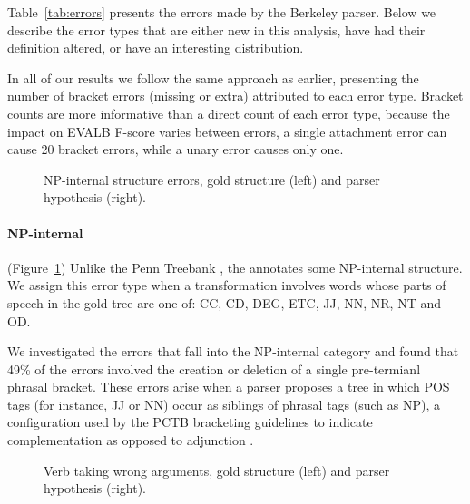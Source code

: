 Table~\ref{tab:errors} presents the errors made by the Berkeley parser.
Below we describe the error types that are either new in this analysis, have had their definition altered, or have an interesting distribution.

In all of our results we follow the same approach as earlier, presenting the number of bracket errors (missing or extra) attributed to each error type.
Bracket counts are more informative than a direct count of each error type, because the impact on EVALB F-score varies between errors, \myeg a single attachment error can cause 20 bracket errors, while a unary error causes only one.

\begin{figure}
\centering
  \caption{NP-internal structure errors, gold structure (left) and parser hypothesis (right).}\label{fig:np_internal}
\end{figure}

\paragraph{NP-internal} (Figure~\ref{fig:np_internal})
Unlike the Penn Treebank \parencite{ptb}, the \pctb annotates some NP-internal structure.
We assign this error type when a transformation involves words whose parts of speech in the gold tree are one of: CC, CD, DEG, ETC, JJ, NN, NR, NT and OD.

We investigated the errors that fall into the NP-internal category and found that 49\% of the errors involved the creation or deletion of a single pre-termianl phrasal bracket.
These errors arise when a parser proposes a tree in which POS tags (for instance, JJ or NN) occur as siblings of phrasal tags (such as NP), a configuration used by the PCTB bracketing guidelines to indicate complementation as opposed to adjunction \parencite{Xue:2005:NLE}.

\begin{figure}
\centering
  \caption{Verb taking wrong arguments, gold structure (left) and parser hypothesis (right).}\label{fig:wrong_arg}
\end{figure}

